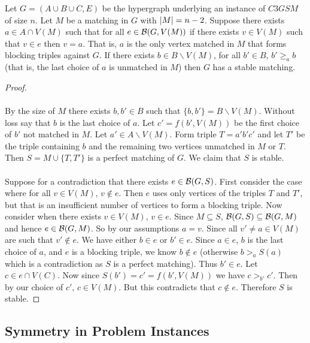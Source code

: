 \begin{lemma}\label{lemma:fixing}
Let $G = (A\cup B \cup C, E)$ be the hypergraph underlying an instance of $C3GSM$ of size $n$. Let $M$ be a matching in $G$ with $\left|M\right| = n-2$. Suppose there exists $a \in A \cap V(M)$ such that for all $e \in \mathcal{B}(G, V(M))$ if there exists $v \in V(M)$ such that $v \in e$ then $v = a$. That is, $a$ is the only vertex matched in $M$ that forms blocking triples against $G$. If there exists $b \in B\backslash V(M)$, for all $b' \in B$, $b' \geq_a b$ (that is, the last choice of $a$ is unmatched in $M$) then $G$ has a stable matching.
\end{lemma}
\begin{proof}
\paragraph{}
By the size of $M$ there exists $b,b' \in B$ such that $\{b,b'\} = B \backslash V(M)$. Without loss say that $b$ is the last choice of $a$. Let $c' = f(b', V(M))$ be the first choice of $b'$ not matched in $M$. Let $a' \in A\backslash V(M)$. Form triple $T = a'b'c'$ and let $T'$ be the triple containing $b$ and the remaining two vertices unmatched in $M$ or $T$. Then $S = M \cup \{T, T'\}$ is a perfect matching of $G$. We claim that $S$ is stable.
\paragraph{}
Suppose for a contradiction that there exists $e \in \mathcal{B}(G,S)$. First consider the case where for all $v \in V(M)$, $v \not\in e$. Then $e$ uses only vertices of the triples $T$ and $T'$, but that is an insufficient number of vertices to form a blocking triple. Now consider when there exists $v \in V(M)$, $v \in e$. Since $M \subseteq S$, $\mathcal{B}(G,S) \subseteq \mathcal{B}(G,M)$ and hence $e \in \mathcal{B}(G,M)$. So by our assumptions $a=v$. Since all $v' \neq a \in V(M)$ are such that $v' \not\in e$. We have either $b \in e$ or $b' \in e$. Since $a \in e$, $b$ is the last choice of $a$, and $e$ is a blocking triple, we know $b \not\in e$ (otherwise $b >_a S(a)$ which is a contradiction as $S$ is a perfect matching). Thus $b' \in e$. Let $c \in e \cap V(C)$. Now since $S(b') = c' = f(b',V(M))$ we have $c >_{b'} c'$. Then by our choice of $c'$, $c \in V(M)$. But this contradicts that $c \not\in e$. Therefore $S$ is stable.
\end{proof}
\subsection{Symmetry in Problem Instances}\label{subsec:symmetry}
